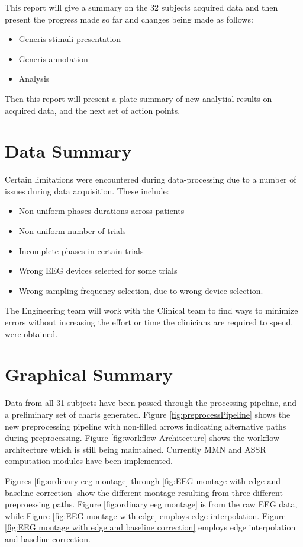 \documentclass[10pt]{article}
\begin{document}
This report will give a summary on the 32 subjects acquired data and then present the progress made so far and changes being made as follows:
  \begin{itemize}
    \item Generis stimuli presentation
    \item Generis annotation
    \item Analysis
  \end{itemize}
Then this report will present a plate summary of new analytial results on acquired data, and the next set of action points.

\section{Data Summary}
Certain limitations were encountered during data-processing due to a number of issues during data acquisition. These include:
\begin{itemize}
  \item Non-uniform phases durations across patients
  \item Non-uniform number of trials
  \item Incomplete phases in certain trials
  \item Wrong EEG devices selected for some trials
  \item Wrong sampling frequency selection, due to wrong device selection.
\end{itemize}

The Engineering team will work with the Clinical team to find ways to minimize errors without increasing the effort or time the clinicians are required to spend.
were obtained.
            

\section{Graphical Summary}
Data from all 31 subjects have been passed through the processing pipeline, and a preliminary set of charts generated. Figure \ref{fig:preprocessPipeline} shows the new preprocessing pipeline with non-filled arrows indicating alternative paths during preprocessing.
Figure \ref{fig:workflow Architecture} shows the workflow architecture which is still being maintained. Currently MMN and ASSR computation modules 
have been implemented.

Figures \ref{fig:ordinary eeg montage} through \ref{fig:EEG montage with edge and baseline correction} show the different montage resulting from three different preproessing paths. 
Figure \ref{fig:ordinary eeg montage} is from the raw EEG data, while Figure \ref{fig:EEG montage with edge} employs edge interpolation.
Figure \ref{fig:EEG montage with edge and baseline correction} employs edge interpolation and baseline correction.
\end{document}
